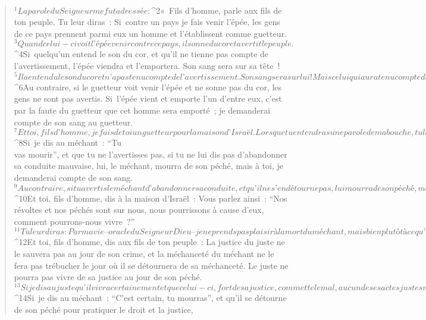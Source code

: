   
  
      
         
      \bchapter{}
      \begin{verse}
${}^{1}La parole du Seigneur me fut adressée : 
${}^{2}« Fils d’homme, parle aux fils de ton peuple. Tu leur diras : Si contre un pays je fais venir l’épée, les gens de ce pays prennent parmi eux un homme et l’établissent comme guetteur. 
${}^{3}Quand celui-ci voit l’épée venir contre ce pays, il sonne du cor et avertit le peuple. 
${}^{4}Si quelqu’un entend le son du cor, et qu’il ne tienne pas compte de l’avertissement, l’épée viendra et l’emportera. Son sang sera sur sa tête ! 
${}^{5}Il a entendu le son du cor et n’a pas tenu compte de l’avertissement. Son sang sera sur lui ! Mais celui qui aura tenu compte de l’avertissement aura la vie sauve. 
${}^{6}Au contraire, si le guetteur voit venir l’épée et ne sonne pas du cor, les gens ne sont pas avertis. Si l’épée vient et emporte l’un d’entre eux, c’est par la faute du guetteur que cet homme sera emporté ; je demanderai compte de son sang au guetteur.
${}^{7}Et toi, fils d’homme, je fais de toi un guetteur pour la maison d’Israël. Lorsque tu entendras une parole de ma bouche, tu les avertiras de ma part. 
${}^{8}Si je dis au méchant : “Tu\\vas mourir”, et que tu ne l’avertisses pas, si tu ne lui dis pas d’abandonner sa conduite mauvaise, lui, le méchant, mourra de son péché, mais à toi, je demanderai compte de son sang. 
${}^{9}Au contraire, si tu avertis le méchant d’abandonner sa conduite, et qu’il ne s’en détourne pas, lui mourra de son péché, mais toi, tu auras sauvé ta vie.
${}^{10}Et toi, fils d’homme, dis à la maison d’Israël : Vous parlez ainsi : “Nos révoltes et nos péchés sont sur nous, nous pourrissons à cause d’eux, comment pourrons-nous vivre ?” 
${}^{11}Tu leur diras : Par ma vie – oracle du Seigneur Dieu – je ne prends pas plaisir à la mort du méchant, mais bien plutôt à ce qu’il se détourne de sa conduite et qu’il vive. Retournez-vous ! Détournez-vous de votre conduite mauvaise. Pourquoi vouloir mourir, maison d’Israël ?
${}^{12}Et toi, fils d’homme, dis aux fils de ton peuple : La justice du juste ne le sauvera pas au jour de son crime, et la méchanceté du méchant ne le fera pas trébucher le jour où il se détournera de sa méchanceté. Le juste ne pourra pas vivre de sa justice au jour de son péché. 
${}^{13}Si je dis au juste qu’il vivra certainement et que celui-ci, fort de sa justice, commette le mal, aucun de ses actes justes ne sera retenu, il mourra en raison du mal qu’il a commis. 
${}^{14}Si je dis au méchant : “C’est certain, tu mourras”, et qu’il se détourne de son péché pour pratiquer le droit et la justice, 

\end{verse}
